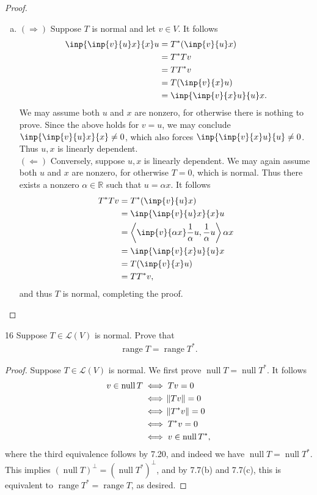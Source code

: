 \documentclass{extarticle}
\newenvironment{problem}[1]{\begin{prob*}{#1}{}}{\end{prob*}}
\newcommand{\R}{\mathbb{R}}
\newcommand{\Hom}{\mathcal{L}}
\DeclareMathOperator{\Null}{null}
\DeclareMathOperator{\Range}{range}
\begin{document}
\begin{proof}
\begin{enumerate}[(a), listparindent=1.5em]
\begin{align*}
&= \inp{v}{x}u\\
&= T^\ast,
\end{align*}
and thus $T$ is self-adjoint, completing the proof.
\item $(\Rightarrow)$ Suppose $T$ is normal and let $v\in V$.  It follows
\begin{align*}
\inp{\inp{v}{u}x}{x}u &= T^\ast(\inp{v}{u}x)\\
&= T^\ast Tv\\
&= TT^\ast v\\
&= T(\inp{v}{x}u)\\
&= \inp{\inp{v}{x}u}{u}x.
\end{align*}
We may assume both $u$ and $x$ are nonzero, for otherwise there is nothing to prove.  Since the above holds for $v = u$, we may conclude $\inp{\inp{v}{u}x}{x} \neq 0$, which also forces $\inp{\inp{v}{x}u}{u} \neq 0$.  Thus $u, x$ is linearly dependent.\\
\indent $(\Leftarrow)$ Conversely, suppose $u,x$ is linearly dependent.  We may again assume both $u$ and $x$ are nonzero, for otherwise $T = 0$, which is normal.  Thus there exists a nonzero $\alpha\in\R$ such that $u = \alpha x$.  It follows
\begin{align*}
T^\ast Tv &= T^\ast(\inp{v}{u}x)\\
&= \inp{\inp{v}{u}x}{x}u\\
&= \left\langle\inp{v}{\alpha x}\frac{1}{\alpha} u, \frac{1}{\alpha}u\right\rangle \alpha x\\
&= \inp{\inp{v}{x}u}{u}x\\
&= T(\inp{v}{x}u)\\
&= TT^\ast v,
\end{align*}
and thus $T$ is normal, completing the proof. \qedhere
\end{enumerate}
\end{proof}

\begin{problem}{16}
Suppose $T\in\Hom(V)$ is normal.  Prove that
\begin{align*}
\Range T = \Range T^\ast.
\end{align*}
\end{problem}
\begin{proof}
Suppose $T\in\Hom(V)$ is normal.  We first prove $\Null T = \Null T^\ast$.  It follows
\begin{align*}
v\in\Null T &\iff Tv = 0\\
&\iff \norm{Tv} = 0\\
&\iff \norm{T^\ast v} = 0\\
&\iff T^\ast v = 0\\
&\iff v\in\Null T^\ast,
\end{align*}
where the third equivalence follows by 7.20, and indeed we have $\Null T = \Null T^\ast$.  This implies $(\Null T)^\perp = (\Null T^\ast)^\perp$,
and by 7.7(b) and 7.7(c), this is equivalent to $\Range T^\ast = \Range T$, as desired.
\end{proof}
\end{document}
